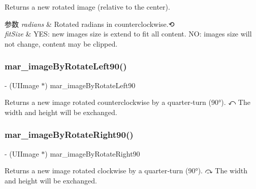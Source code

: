 Returns a new rotated image (relative to the center).


\begin{DoxyParams}{参数}
{\em radians} & Rotated radians in counterclockwise.\+⟲\\
\hline
{\em fit\+Size} & Y\+ES\+: new image\textquotesingle{}s size is extend to fit all content. NO\+: image\textquotesingle{}s size will not change, content may be clipped. \\
\hline
\end{DoxyParams}
\mbox{\label{category_u_i_image_07_m_a_r_e_x_08_ae0b14ff942eb84cd3b6de64367580f2f}} 
\subsubsection{\texorpdfstring{mar\+\_\+image\+By\+Rotate\+Left90()}{mar\_imageByRotateLeft90()}}
{\footnotesize\ttfamily -\/ (U\+I\+Image $\ast$) mar\+\_\+image\+By\+Rotate\+Left90 \begin{DoxyParamCaption}{ }\end{DoxyParamCaption}}

Returns a new image rotated counterclockwise by a quarter‑turn (90°). ⤺ The width and height will be exchanged. \mbox{\label{category_u_i_image_07_m_a_r_e_x_08_a01724eeadd53e5d8530d90dcfa93a82e}} 
\subsubsection{\texorpdfstring{mar\+\_\+image\+By\+Rotate\+Right90()}{mar\_imageByRotateRight90()}}
{\footnotesize\ttfamily -\/ (U\+I\+Image $\ast$) mar\+\_\+image\+By\+Rotate\+Right90 \begin{DoxyParamCaption}{ }\end{DoxyParamCaption}}

Returns a new image rotated clockwise by a quarter‑turn (90°). ⤼ The width and height will be exchanged. \mbox{\label{category_u_i_image_07_m_a_r_e_x_08_a3928ead790b37d111c1e1c059c302211}} 
